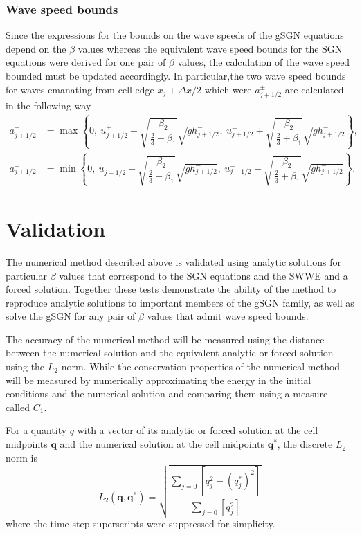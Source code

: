 \documentclass[10pt]{elsarticle}
\newcommand{\vecn}[1]{\boldsymbol{#1}}
\begin{document}
\subsubsection{Wave speed bounds}
Since the expressions for the bounds on the wave speeds of the gSGN equations depend on the $\beta$ values whereas the equivalent wave speed bounds for the SGN equations were derived for one pair of $\beta$ values, the calculation of the wave speed bounded must be updated accordingly. In particular,the two wave speed bounds for waves emanating from cell edge $x_{j} + \Delta x /2$ which were $a^\pm_{j+1/2}$ are calculated in the following way
\begin{align}
a^+_{j+1/2} &= \max\left\lbrace 0, \: u^+_{j+1/2} + \sqrt{\dfrac{\beta_2}{\frac{2}{3} + \beta_1}} \sqrt{g h^-_{j+1/2}}, \: u^-_{j+1/2} + \sqrt{\dfrac{\beta_2}{\frac{2}{3} + \beta_1}}\sqrt{g h^-_{j+1/2}} \right\rbrace, \\
a^-_{j+1/2} &= \min\left\lbrace 0,\: u^+_{j+1/2} - \sqrt{\dfrac{\beta_2}{\frac{2}{3} + \beta_1}}\sqrt{g h^-_{j+1/2}},\: u^-_{j+1/2} - \sqrt{\dfrac{\beta_2}{\frac{2}{3} + \beta_1}}\sqrt{g h^-_{j+1/2}} \right\rbrace.
\end{align}


\section{Validation}
The numerical method described above is validated using analytic solutions for particular $\beta$ values that correspond to the SGN equations and the SWWE and a forced solution. Together these tests demonstrate the ability of the method to reproduce analytic solutions to important members of the gSGN family, as well as solve the gSGN for any pair of $\beta$ values that admit wave speed bounds.

The accuracy of the numerical method will be measured using the distance between the numerical solution and the equivalent analytic or forced solution using the $L_2$ norm. While the conservation properties of the numerical method will be measured by numerically approximating the energy in the initial conditions and the numerical solution and comparing them using a measure called $C_1$.

For a quantity $q$ with a vector of its analytic or forced solution at the cell midpoints $\vecn{q}$ and the numerical solution at the cell midpoints $\vecn{q}^*$, the discrete $L_2$ norm is
\begin{equation}
\label{eqn:Conv_Error}
L_2\left(\vecn{q},\vecn{q}^*\right) = \sqrt{ \dfrac{\sum_{j = 0}  \left[q_j^2 - \left(q^*_j\right)^2 \right]}{\sum_{j = 0}  \left[q_j^2 \right]}}
\end{equation}
where the time-step superscripts were suppressed for simplicity.
\end{document}
